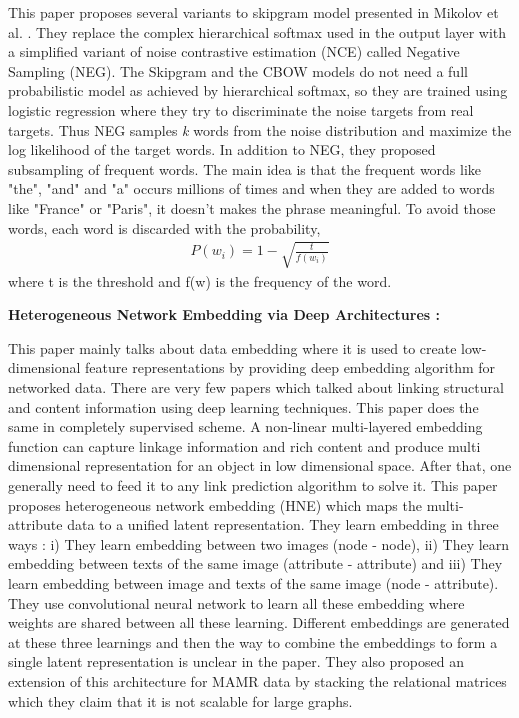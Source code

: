 This paper proposes several variants to skipgram model presented in Mikolov et al. \cite{word2vec}. They replace the complex hierarchical softmax used in the output layer with a simplified variant of noise contrastive estimation (NCE) called Negative Sampling (NEG). The Skipgram and the CBOW models do not need a full probabilistic model as achieved by hierarchical softmax, so they are trained using logistic regression where they try to discriminate the noise targets from real targets. Thus NEG samples \textit{k} words from the noise distribution and maximize the log likelihood of the target words. In addition to NEG, they proposed subsampling of frequent words. The main idea is that the frequent words like "the", "and" and "a" occurs millions of times and when they are added to words like "France" or "Paris", it doesn't makes the phrase meaningful. To avoid those words, each word is discarded with the probability,
\begin{align*}
P(w_i) = 1 - \sqrt{\frac{t}{f(w_i)}}
\end{align*}
where t is the threshold and f(w) is the frequency of the word.
\begin{flushleft}
\textbf{Heterogeneous Network Embedding via Deep Architectures \cite{hne} :}
\end{flushleft}

This paper mainly talks about data embedding where it is used to create low-dimensional feature representations by providing deep embedding algorithm for networked data. There are very few papers which talked about linking structural and content information using deep learning techniques. This paper does the same in completely supervised scheme. A non-linear multi-layered embedding function can capture linkage information and rich content and produce multi dimensional representation for an object in low dimensional space. After that, one generally need to feed it to any link prediction algorithm to solve it. This paper proposes heterogeneous network embedding (HNE) which maps the multi-attribute data to a unified latent representation. They learn embedding in three ways : i) They learn embedding between two images (node - node), ii) They learn embedding between texts of the same image (attribute - attribute) and iii) They learn embedding between image and texts of the same image (node - attribute). They use convolutional neural network to learn all these embedding where weights are shared between all these learning. Different embeddings are generated at these three learnings and then the way to combine the embeddings to form a single latent representation is unclear in the paper. They also proposed an extension of this architecture for MAMR data by stacking the relational matrices which they claim that it is not scalable for large graphs.

